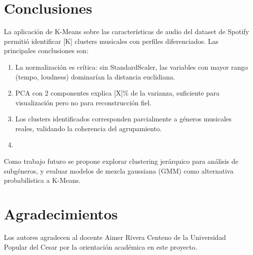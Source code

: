 \section{Conclusiones}

La aplicación de K-Means sobre las características de audio del dataset
de Spotify permitió identificar [K] clusters musicales con perfiles
diferenciados. Las principales conclusiones son:

\begin{enumerate}
  \item La normalización es crítica: sin StandardScaler, las variables
        con mayor rango (tempo, loudness) dominarían la distancia euclidiana.
  \item PCA con 2 componentes explica [X]\% de la varianza, suficiente
        para visualización pero no para reconstrucción fiel.
  \item Los clusters identificados corresponden parcialmente a géneros
        musicales reales, validando la coherencia del agrupamiento.
  \item [Completar con hallazgo específico del análisis]
\end{enumerate}

Como trabajo futuro se propone explorar clustering jerárquico para
análisis de subgéneros, y evaluar modelos de mezcla gaussiana (GMM)
como alternativa probabilística a K-Means.

\section*{Agradecimientos}
Los autores agradecen al docente Aimer Rivera Centeno de la Universidad
Popular del Cesar por la orientación académica en este proyecto.
